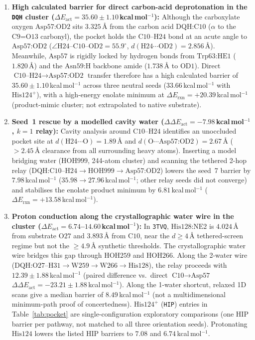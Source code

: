 \documentclass[11pt,a4paper]{article}
\begin{document}
\begin{enumerate}
\item \textbf{High calculated barrier for direct carbon-acid deprotonation in the \texttt{DQH} cluster ($\Delta E_{\text{act}} = 35.60 \pm 1.10$\,kcal\,mol$^{-1}$):}
Although the carboxylate oxygen $\text{Asp57:OD2}$ sits $3.325$\,\AA{} from the carbon acid $\text{DQH:C10}$ ($\alpha$ to the $\text{C9=O13}$ carbonyl), the pocket holds the $\text{C10--H24}$ bond at an acute angle to $\text{Asp57:OD2}$ ($\angle\text{H24--C10--OD2} = 55.9^\circ$, $d(\text{H24}\cdots\text{OD2}) = 2.856$\,\AA{}). Meanwhile, $\text{Asp57}$ is rigidly locked by hydrogen bonds from $\text{Trp63:HE1}$ ($1.820$\,\AA{}) and the $\text{Asn59:H}$ backbone amide ($1.738$\,\AA{} to $\text{OD1}$). Direct $\text{C10--H24}\to\text{Asp57:OD2}$ transfer therefore has a high calculated barrier of $35.60 \pm 1.10$\,kcal\,mol$^{-1}$ across three neutral seeds ($33.66$\,kcal\,mol$^{-1}$ with $\text{His124}^+$), with a high-energy enolate minimum at $\Delta E_{\text{rxn}} = +20.39$\,kcal\,mol$^{-1}$ (product-mimic cluster; not extrapolated to native substrate).
\item \textbf{Seed~1 rescue by a modelled cavity water ($\Delta\Delta E_{\text{act}} = -7.98$\,kcal\,mol$^{-1}$, $k=1$ relay):}
Cavity analysis around $\text{C10--H24}$ identifies an unoccluded pocket site at $d(\text{H24}\cdots\text{O}) = 1.89$\,\AA{} and $d(\text{O}\cdots\text{Asp57:OD2}) = 2.67$\,\AA{} ($>2.45$\,\AA{} clearance from all surrounding heavy atoms). Inserting a model bridging water ($\text{HOH999}$, 244-atom cluster) and scanning the tethered 2-hop relay ($\text{DQH:C10--H24} \to \text{HOH999} \to \text{Asp57:OD2}$) lowers the seed~7 barrier by $7.98$\,kcal\,mol$^{-1}$ ($35.98 \to 27.96$\,kcal\,mol$^{-1}$; other relay seeds did not converge) and stabilises the enolate product minimum by $6.81$\,kcal\,mol$^{-1}$ ($\Delta E_{\text{rxn}} = +13.58$\,kcal\,mol$^{-1}$).
\item \textbf{Proton conduction along the crystallographic water wire in the cluster ($\Delta E_{\text{act}} = 6.74$--$14.60$\,kcal\,mol$^{-1}$):}
In \texttt{3TVQ}, $\text{His128:NE2}$ is $4.024$\,\AA{} from substrate $\text{O27}$ and $3.893$\,\AA{} from $\text{C10}$, near the $d \ge 4$\,\AA{} tethered-screen regime but not the $\ge 4.9$\,\AA{} synthetic thresholds. The crystallographic water wire bridges this gap through $\text{HOH259}$ and $\text{HOH266}$. Along the 2-water wire ($\text{DQH:O27--H31}\to\text{W259}\to\text{W266}\to\text{His128}$), the relay proceeds with $\mathbf{12.39 \pm 1.88}$\,kcal\,mol$^{-1}$ (paired difference vs.\ direct $\text{C10}\to\text{Asp57}$ $\Delta\Delta E_{\text{act}} = -23.21 \pm 1.88$\,kcal\,mol$^{-1}$). Along the 1-water shortcut, relaxed 1D scans give a median barrier of $\mathbf{8.49}$\,kcal\,mol$^{-1}$ (not a multidimensional minimum-path proof of concertedness). $\text{His124}^+$ (\texttt{HIP}) entries in Table~\ref{tab:pocket} are single-configuration exploratory comparisons (one HIP barrier per pathway, not matched to all three orientation seeds). Protonating $\text{His124}$ lowers the listed HIP barriers to $\mathbf{7.08}$ and $\mathbf{6.74}$\,kcal\,mol$^{-1}$.
\end{enumerate}
\end{document}
